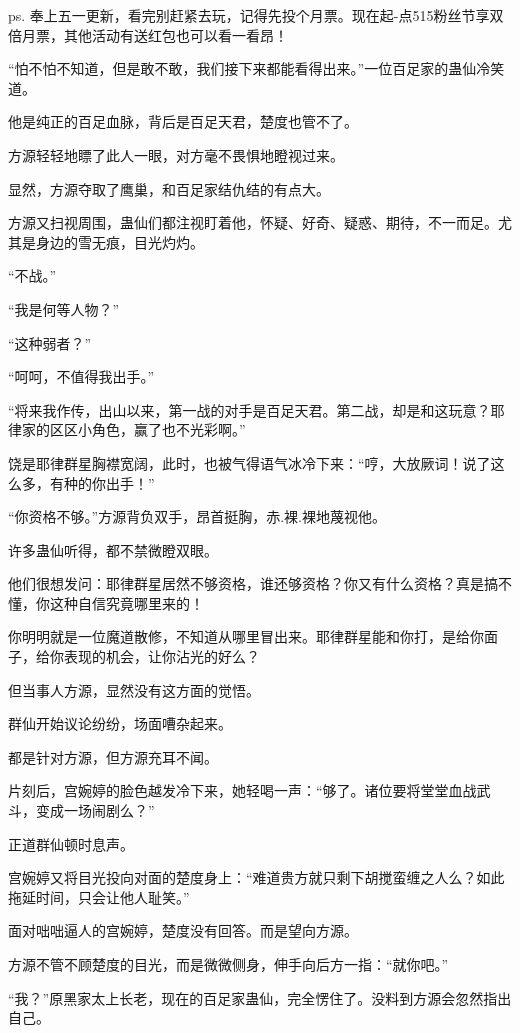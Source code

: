 
\begin{this_body}

ps. 奉上五一更新，看完别赶紧去玩，记得先投个月票。现在起-点515粉丝节享双倍月票，其他活动有送红包也可以看一看昂！

“怕不怕不知道，但是敢不敢，我们接下来都能看得出来。”一位百足家的蛊仙冷笑道。

他是纯正的百足血脉，背后是百足天君，楚度也管不了。

方源轻轻地瞟了此人一眼，对方毫不畏惧地瞪视过来。

显然，方源夺取了鹰巢，和百足家结仇结的有点大。

方源又扫视周围，蛊仙们都注视盯着他，怀疑、好奇、疑惑、期待，不一而足。尤其是身边的雪无痕，目光灼灼。

“不战。”

“我是何等人物？”

“这种弱者？”

“呵呵，不值得我出手。”

“将来我作传，出山以来，第一战的对手是百足天君。第二战，却是和这玩意？耶律家的区区小角色，赢了也不光彩啊。”

饶是耶律群星胸襟宽阔，此时，也被气得语气冰冷下来：“哼，大放厥词！说了这么多，有种的你出手！”

“你资格不够。”方源背负双手，昂首挺胸，赤.裸.裸地蔑视他。

许多蛊仙听得，都不禁微瞪双眼。

他们很想发问：耶律群星居然不够资格，谁还够资格？你又有什么资格？真是搞不懂，你这种自信究竟哪里来的！

你明明就是一位魔道散修，不知道从哪里冒出来。耶律群星能和你打，是给你面子，给你表现的机会，让你沾光的好么？

但当事人方源，显然没有这方面的觉悟。

群仙开始议论纷纷，场面嘈杂起来。

都是针对方源，但方源充耳不闻。

片刻后，宫婉婷的脸色越发冷下来，她轻喝一声：“够了。诸位要将堂堂血战武斗，变成一场闹剧么？”

正道群仙顿时息声。

宫婉婷又将目光投向对面的楚度身上：“难道贵方就只剩下胡搅蛮缠之人么？如此拖延时间，只会让他人耻笑。”

面对咄咄逼人的宫婉婷，楚度没有回答。而是望向方源。

方源不管不顾楚度的目光，而是微微侧身，伸手向后方一指：“就你吧。”

“我？”原黑家太上长老，现在的百足家蛊仙，完全愣住了。没料到方源会忽然指出自己。


\end{this_body}
